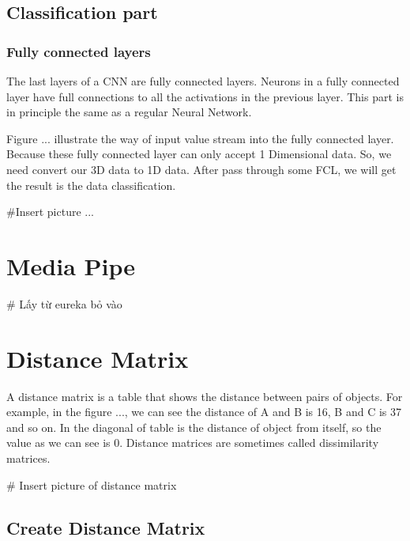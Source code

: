     \subsection{ Classification part }
      \subsubsection{ Fully connected layers }
        The last layers of a CNN are fully connected layers. Neurons in a 
        fully connected layer have full connections to all the activations in the previous 
        layer. This part is in principle the same as a regular Neural Network.

        Figure ... illustrate the way of input value stream into the fully connected layer.
        Because these fully connected layer can only accept 1 Dimensional data. So, we need convert our 3D
        data to 1D data. After pass through some FCL, we will get the result is the data
        classification.

        #Insert picture ...
  \section{ Media Pipe }
    # Lấy từ eureka bỏ vào


  \section{ Distance Matrix }
    A distance matrix is a table that shows the distance between pairs of objects.
    For example, in the figure ..., we can see the distance of A and B is 16, B and C is 37
    and so on. In the diagonal of table is the distance of object from itself, so the value
    as we can see is 0. Distance matrices are sometimes called dissimilarity matrices.

    # Insert picture of distance matrix

    \subsection{ Create Distance Matrix }
      A distance matrix is computed from a raw data table (Figure ...). 
      
      In the example below, we can use high school math (Pythagoras) to work out 
      that distance between A and B. 
        # Chèn công thức vào đây
      
      We can use same formula with more than two variables, and this is known as 
      the Euclidean distance.

      In result, we have the distance matrix represented like Figure ...
      # Chèn bảng kết quả vào
  
  \section{ Beam search with CTC decoder }
    CheckList:
      [] BeamSearch
      [] CTC recap
      [] Combination
      [] Pseudo code
    \subsection{ Beam Search }
      
      

